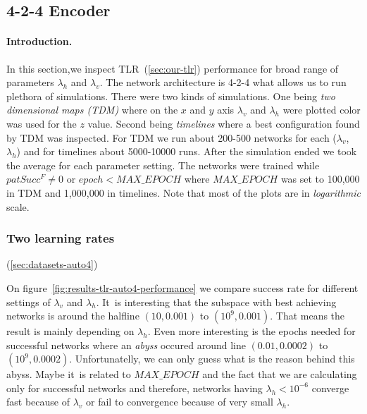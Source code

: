 

\subsection{4-2-4 Encoder} 
\label{sec:results-auto4} 

\paragraph{Introduction.} 
In this section,we inspect TLR~(\ref{sec:our-tlr}) performance for broad range of parameters $\lambda_h$ and $\lambda_v$. The network architecture is 4-2-4 what allows us to run plethora of simulations. There were two kinds of simulations. One being \emph{two dimensional maps (TDM)} where on the $x$ and $y$ axis $\lambda_v$ and $\lambda_h$ were plotted color was used for the $z$ value. Second being \emph{timelines} where a best configuration found by TDM was inspected. For TDM we run about 200-500 networks for each ($\lambda_v$, $\lambda_h$) and for timelines about 5000-10000 runs. After the simulation ended we took the average for each parameter setting. The networks were trained while $patSucc^F \neq 0$ or $epoch < MAX\_EPOCH$ where $MAX\_EPOCH$ was set to 100,000 in TDM and 1,000,000 in timelines. Note that most of the plots are in \emph{logarithmic} scale. 

 

\subsubsection{Two learning rates} 
\label{sec:tlr-auto4} 
(\ref{sec:datasets-auto4}) 

On figure~\ref{fig:results-tlr-auto4-performance} we compare success rate for different settings of $\lambda_v$ and $\lambda_h$. It~is interesting that the subspace with best achieving networks is around the halfline $(10, 0.001)$ to $(10^9, 0.001)$. That means the result is mainly depending on $\lambda_h$. Even more interesting is the epochs needed for successful networks where an \emph{abyss} occured around line $(0.01, 0.0002)$ to $(10^9, 0.0002)$. Unfortunatelly, we can only guess what is the reason behind this abyss. Maybe it~is related to $MAX\_EPOCH$ and the fact that we are calculating only for successful networks and therefore, networks having $\lambda_h < 10^{-6}$ converge fast because of $\lambda_v$ or fail to convergence because of very small $\lambda_h$. 

